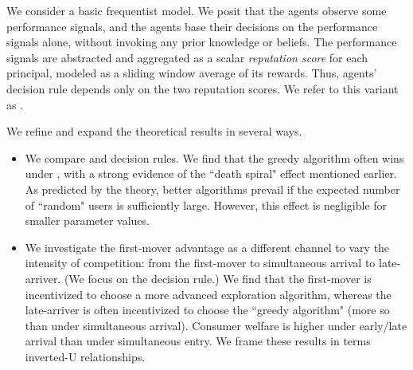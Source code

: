We consider a basic frequentist model. We posit that the agents observe some performance signals, and the agents base their decisions on the performance signals alone, without invoking any prior knowledge or beliefs. The performance signals are abstracted and aggregated as a scalar \emph{reputation score} for each principal, modeled as a sliding window average of its rewards. Thus, agents' decision rule depends only on the two reputation scores. We refer to this variant as \emExptsModel.%

We refine and expand the theoretical results in several ways.

\begin{itemize}
\item We compare \HardMax and \HardMaxRandom decision rules. We find that the greedy algorithm often wins under \HardMax, with a strong evidence of the ``death spiral" effect mentioned earlier. As predicted by the theory, better algorithms prevail if the expected number of ``random" users is sufficiently large. However, this effect is negligible for smaller parameter values.
    

\item We investigate the first-mover advantage as a different channel to vary the intensity of competition: from the first-mover to simultaneous arrival to late-arriver. (We focus on the \HardMax decision rule.) We find that the first-mover is incentivized to choose a more advanced exploration algorithm, whereas the late-arriver is often incentivized to choose the ``greedy algorithm" (more so than under simultaneous arrival). Consumer welfare is higher under early/late arrival than under simultaneous entry. We frame these results in terms inverted-U relationships.




\end{itemize}
